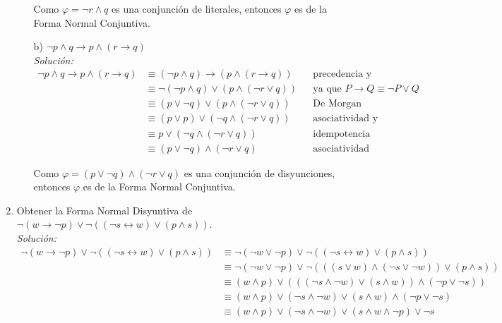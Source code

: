 \documentclass[letterpaper,10pt]{article}
\begin{document}
\begin{enumerate}
\begin{itemize}
            Como $\varphi = \neg r \land q$ es una conjunción de literales, 
            entonces $\varphi$ es de la Forma Normal Conjuntiva.

            \item[b)] $\neg p \land q \rightarrow p \land (r \rightarrow q)$ \\
            \textit{Solución:} 
            \begin{align*}
                \neg p \land q \rightarrow p \land (r \rightarrow q)
                &\equiv (\neg p \land q) \rightarrow (p \land (r \rightarrow q))
                && \text{precedencia y asociatividad de conectivos} \\
                &\equiv \neg (\neg p \land q) \lor (p \land (\neg r \lor q))
                && \text{{ya que $P \rightarrow Q \equiv \neg P \lor Q$}} \\
                &\equiv (p \lor \neg q) \lor (p \land (\neg r \lor q))
                && \text{De Morgan} \\
                &\equiv (p \lor p) \lor (\neg q \land (\neg r \lor q))
                && \text{asociatividad y conmutatividad} \\
                &\equiv p \lor (\neg q \land (\neg r \lor q))
                && \text{idempotencia} \\
                &\equiv (p \lor \neg q) \land (\neg r \lor q)
                && \text{asociatividad}
            \end{align*}

            Como $\varphi =  (p \lor \neg q) \land (\neg r \lor q)$ es una 
            conjunción de disyunciones, entonces $\varphi$ es de la Forma 
            Normal Conjuntiva.
             
        \end{itemize}

        \item Obtener la Forma Normal Disyuntiva de 
        $\neg (w \rightarrow \neg p) \lor \neg ((\neg s \leftrightarrow w) 
        \lor (p \land s))$. \\
        \textit{Solución:} 
        \begin{align*}
            \neg (w \rightarrow \neg p) \lor \neg ((\neg s \leftrightarrow w) 
            \lor (p \land s))
            &\equiv \neg (\neg w \lor \neg p) \lor 
            \neg ((\neg s \leftrightarrow w) \lor (p \land s)) \\
            &\equiv \neg (\neg w \lor \neg p) \lor 
            \neg (((s \lor w) \land (\neg s \lor \neg w)) \lor (p \land s)) \\
            &\equiv (w \land p) \lor (((\neg s \land \neg w) \lor 
            (s \land w)) \land (\neg p \lor \neg s)) \\
            &\equiv (w \land p) \lor (\neg s \land \neg w) \lor (s \land w)
            \land (\neg p \lor \neg s) \\
            &\equiv (w \land p) \lor (\neg s \land \neg w) \lor (s \land w
            \land \neg p) \lor \neg s
        \end{align*}


\end{enumerate}
\end{document}

